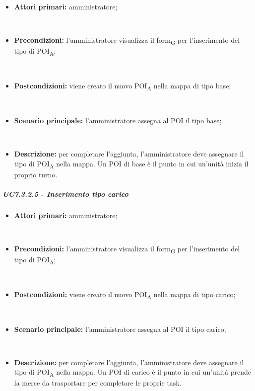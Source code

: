 \begin{itemize}

​    \item   \textbf{Attori primari:} amministratore;

​    \item   \textbf{Precondizioni:} l'amministratore visualizza il form\textsubscript{G} per l'inserimento del tipo di POI\textsubscript{A};

​    \item   \textbf{Postcondizioni:} viene creato il nuovo POI\textsubscript{A} nella mappa di tipo base; 

​    \item   \textbf{Scenario principale:} l'amministratore assegna al POI il tipo base;

​    \item   \textbf{Descrizione:} per completare l'aggiunta, l'amministratore deve assegnare il tipo di POI\textsubscript{A} nella mappa. Un POI di base è il punto in cui un'unità inizia il proprio turno.



\end{itemize}



\subparagraph{UC7.3.2.5 - Inserimento tipo carico}

\begin{itemize}

​    \item   \textbf{Attori primari:} amministratore;

​    \item   \textbf{Precondizioni:} l'amministratore visualizza il form\textsubscript{G} per l'inserimento del tipo di POI\textsubscript{A};

​    \item   \textbf{Postcondizioni:} viene creato il nuovo POI\textsubscript{A} nella mappa di tipo carico; 

​    \item   \textbf{Scenario principale:} l'amministratore assegna al POI il tipo carico;

​    \item   \textbf{Descrizione:} per completare l'aggiunta, l'amministratore deve assegnare il tipo di POI\textsubscript{A} nella mappa. Un POI di carico è il punto in cui un'unità prende la merce da trasportare per completare le proprie task.



\end{itemize}



